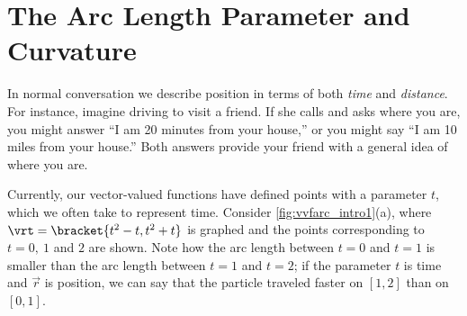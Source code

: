 \section{The Arc Length Parameter and Curvature}\label{sec:curvature}

In normal conversation we describe position in terms of both \emph{time} and \emph{distance}. For instance, imagine driving to visit a friend. If she calls and asks where you are, you might answer ``I am 20 minutes from your house,'' or you might say ``I am 10 miles from your house.'' Both answers provide your friend with a general idea of where you are.

Currently, our vector-valued functions have defined points with a parameter $t$, which we often take to represent time. Consider \autoref{fig:vvfarc_intro1}(a), where $\vrt =\bracket{t^2-t,t^2+t}$ is graphed and the points corresponding to $t=0,\ 1$ and $2$ are shown. Note how the arc length between $t=0$ and $t=1$ is smaller than the arc length between $t=1$ and $t=2$; if the parameter $t$ is time and $\vec r$ is position, we can say that the particle traveled faster on $[1,2]$ than on $[0,1]$. 
